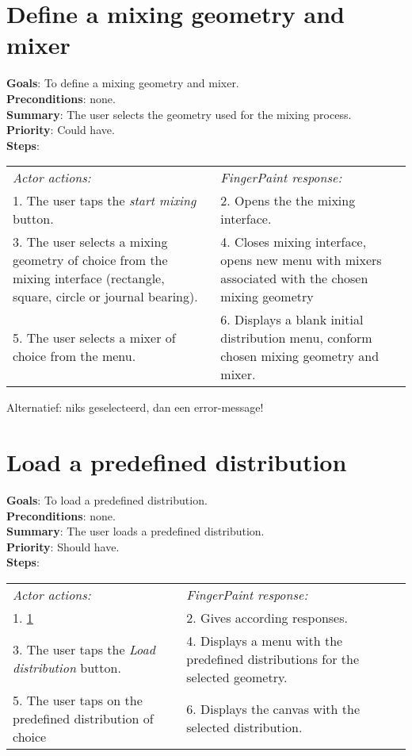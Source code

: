 \begin{appendices}
\section{Define a mixing geometry and mixer}
  \label{geomixer}
  \textbf{Goals}: To define a mixing geometry and mixer.\\
  \textbf{Preconditions}: none.\\
  \textbf{Summary}: The user selects the geometry used for the mixing process.\\
  \textbf{Priority}: Could have.\\
  \textbf{Steps}: \\
  \begin{tabular}{ p{} p{} }
  	\emph{Actor actions:} & \emph{FingerPaint response:} \\
	1. The user taps the \emph{start mixing} button. & 2. Opens the the mixing interface. \\
	3. The user selects a mixing geometry of choice from the mixing interface (rectangle, square, circle or journal bearing). & 4. Closes mixing interface, opens new menu with mixers associated with the chosen mixing geometry\\
	5. The user selects a mixer of choice from the menu. & 6.	Displays a blank initial distribution menu, conform chosen mixing geometry and mixer.\\
  \end{tabular}

Alternatief: niks geselecteerd, dan een error-message!

  \section{Load a predefined distribution}
  \label{loadpreddist}
  \textbf{Goals}: To load a predefined distribution.\\
  \textbf{Preconditions}: none.\\
  \textbf{Summary}: The user loads a predefined distribution.\\
  \textbf{Priority}: Should have.\\
  \textbf{Steps}: \\
  \begin{tabular}{ p{} p{} }
  	\emph{Actor actions:} & \emph{FingerPaint response:} \\
    1. \ref{geomixer} & 2. Gives according responses. \\
	3. The user taps the \emph{Load distribution} button. & 4. Displays a menu with the predefined distributions for the selected geometry. \\
	5. The user taps on the predefined distribution of choice & 6.	Displays the canvas with the selected distribution. \\
  \end{tabular}



\end{appendices}
